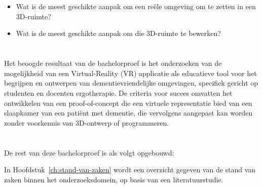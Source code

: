 \section{}%
\label{sec:deelvragen}


\begin{itemize}
\item Wat is de meest geschikte aanpak om een reële omgeving om te zetten in een 3D-ruimte?
\item Wat is de meest geschikte aanpak om die 3D-ruimte te bewerken? 
\end{itemize}




\section{}%
\label{sec:onderzoeksdoelstelling}


Het beoogde resultaat van de bachelorproef is het onderzoeken van de mogelijkheid van een Virtual-Reality (VR) applicatie als educatieve tool voor het begrijpen en ontwerpen van dementievriendelijke omgevingen, specifiek gericht op studenten en docenten ergotherapie.
De criteria voor succes omvatten het ontwikkelen van een proof-of-concept die een virtuele representatie bied van een slaapkamer van een patiënt met dementie, die vervolgens aangepast kan worden zonder voorkennis van 3D-ontwerp of programmeren.


\section{}%
\label{sec:opzet-bachelorproef}


De rest van deze bachelorproef is als volgt opgebouwd:

In Hoofdstuk~\ref{ch:stand-van-zaken} wordt een overzicht gegeven van de stand van zaken binnen het onderzoeksdomein, op basis van een literatuurstudie.


